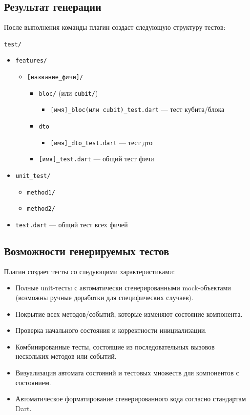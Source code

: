 \documentclass[14pt, russian]{scrartcl}
\begin{document}
\subsection{Результат генерации}

После выполнения команды плагин создаст следующую структуру тестов:

\texttt{test/}
\begin{itemize}
    \item \texttt{features/}
    \begin{itemize}
        \item \texttt{[название\_фичи]/}
        \begin{itemize}
            \item \texttt{bloc/} (или \texttt{cubit/})
            \begin{itemize}
                \item \texttt{[имя]\_bloc(или cubit)\_test.dart} --- тест кубита/блока
            \end{itemize}
            \item \texttt{dto}
            \begin{itemize}
                \item \texttt{[имя]\_dto\_test.dart} --- тест дто
            \end{itemize}
            \item \texttt{[имя]\_test.dart} --- общий тест фичи
        \end{itemize}
    \end{itemize}
    \item \texttt{unit\_test/}
    \begin{itemize}
        \item \texttt{method1/}
        \item \texttt{method2/}
    \end{itemize}
    \item \texttt{test.dart} --- общий тест всех фичей
\end{itemize}

\subsection{Возможности генерируемых тестов}

Плагин создает тесты со следующими характеристиками:

\begin{itemize}
    \item Полные unit-тесты с автоматически сгенерированными mock-объектами (возможны ручные доработки для специфических случаев).
    \item Покрытие всех методов/событий, которые изменяют состояние компонента.
    \item Проверка начального состояния и корректности инициализации.
    \item Комбинированные тесты, состоящие из последовательных вызовов нескольких методов или событий.
    \item Визуализация автомата состояний и тестовых множеств для компонентов с состоянием.
    \item Автоматическое форматирование сгенерированного кода согласно стандартам Dart.
\end{itemize}
\end{document}
